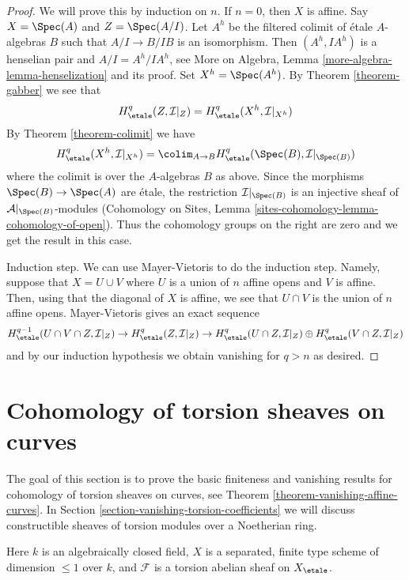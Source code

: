 \begin{proof}
We will prove this by induction on $n$. If $n = 0$, then $X$ is affine.
Say $X = \Spec(A)$ and $Z = \Spec(A/I)$. Let $A^h$ be the filtered colimit
of \'etale $A$-algebras $B$ such that $A/I \to B/IB$ is an isomorphism.
Then $(A^h, IA^h)$ is a henselian pair and $A/I = A^h/IA^h$, see
More on Algebra, Lemma \ref{more-algebra-lemma-henselization}
and its proof. Set $X^h = \Spec(A^h)$.
By Theorem \ref{theorem-gabber}
we see that
$$
H^q_\etale(Z, \mathcal{I}|_Z) = H^q_\etale(X^h, \mathcal{I}|_{X^h})
$$
By Theorem \ref{theorem-colimit} we have
$$
H^q_\etale(X^h, \mathcal{I}|_{X^h}) =
\colim_{A \to B} H^q_\etale(\Spec(B), \mathcal{I}|_{\Spec(B)})
$$
where the colimit is over the $A$-algebras $B$ as above.
Since the morphisms $\Spec(B) \to \Spec(A)$ are \'etale,
the restriction $\mathcal{I}|_{\Spec(B)}$ is an injective
sheaf of $\mathcal{A}|_{\Spec(B)}$-modules
(Cohomology on Sites, Lemma \ref{sites-cohomology-lemma-cohomology-of-open}).
Thus the cohomology groups on the right are zero and we get the
result in this case.

\medskip\noindent
Induction step. We can use Mayer-Vietoris to do the induction step.
Namely, suppose that $X = U \cup V$ where $U$ is a union of $n$ affine
opens and $V$ is affine. Then, using that the diagonal of $X$ is affine,
we see that $U \cap V$ is the union of $n$ affine opens. Mayer-Vietoris
gives an exact sequence
$$
H^{q - 1}_\etale(U \cap V \cap Z, \mathcal{I}|_Z) \to
H^q_\etale(Z, \mathcal{I}|_Z) \to
H^q_\etale(U \cap Z, \mathcal{I}|_Z) \oplus
H^q_\etale(V \cap Z, \mathcal{I}|_Z)
$$
and by our induction hypothesis we obtain vanishing for $q > n$ as desired.
\end{proof}





\section{Cohomology of torsion sheaves on curves}
\label{section-vanishing-torsion}

\noindent
The goal of this section is to prove the basic finiteness and vanishing
results for cohomology of torsion sheaves on curves, see
Theorem \ref{theorem-vanishing-affine-curves}.
In Section \ref{section-vanishing-torsion-coefficients}
we will discuss constructible sheaves of torsion modules
over a Noetherian ring.

\begin{situation}
\label{situation-what-to-prove}
Here $k$ is an algebraically closed field, $X$ is a separated, finite type
scheme of dimension $\leq 1$ over $k$, and $\mathcal{F}$ is a torsion
abelian sheaf on $X_\etale$.
\end{situation}


